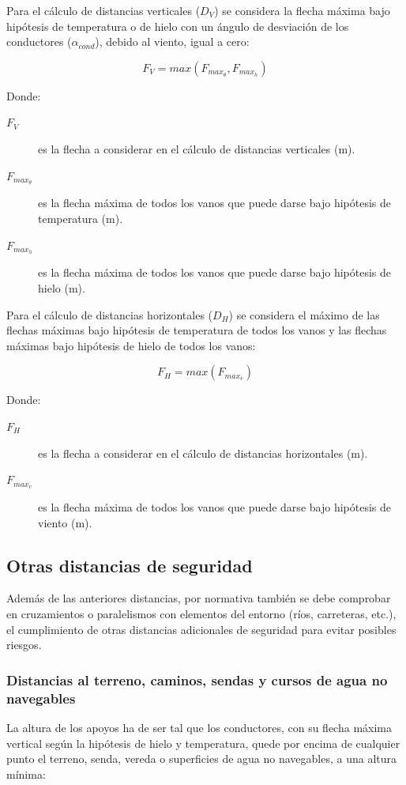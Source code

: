 Para el cálculo de distancias verticales ($D_V$) se considera la flecha máxima bajo hipótesis de temperatura o de hielo con un ángulo de desviación de los conductores ($\alpha_{cond}$), debido al viento, igual a cero:

\begin{equation}
    F_V=max(F_{max_{\theta}},F_{max_{h}})
    \label{eq:flecha-dist-vertical}
\end{equation}

Donde:
\begin{description}
    \item[$F_V$] es la flecha a considerar en el cálculo de distancias verticales (\si{\meter}).
    \item[$F_{max_{\theta}}$] es la flecha máxima de todos los vanos que puede darse bajo hipótesis de temperatura (\si{\meter}).
    \item[$F_{max_{h}}$] es la flecha máxima de todos los vanos que puede darse bajo hipótesis de hielo (\si{\meter}).
\end{description}

Para el cálculo de distancias horizontales ($D_H$) se considera el máximo de las flechas máximas bajo hipótesis de temperatura de todos los vanos y las flechas máximas bajo hipótesis de hielo de todos los vanos:

\begin{equation}
    F_H=max(F_{max_{v}})
    \label{eq:flecha-dist-horizontal}
\end{equation}

Donde:
\begin{description}
    \item[$F_H$] es la flecha a considerar en el cálculo de distancias horizontales (\si{\meter}).
    \item[$F_{max_{v}}$] es la flecha máxima de todos los vanos que puede darse bajo hipótesis de viento (\si{\meter}).
\end{description}

\subsection{Otras distancias de seguridad}
\label{subsec:dist-otras}
Además de las anteriores distancias, por normativa también se debe comprobar en cruzamientos o paralelismos con elementos del entorno (ríos, carreteras, etc.), el cumplimiento de otras distancias adicionales de seguridad para evitar posibles riesgos.
\subsubsection{Distancias al terreno, caminos, sendas y cursos de agua no navegables}
\label{subsubsec:otras-terreno}
La altura de los apoyos ha de ser tal que los conductores, con su flecha máxima vertical según la hipótesis de hielo y temperatura, quede por encima de cualquier punto el terreno, senda, vereda o superficies de agua no navegables, a una altura mínima: 


